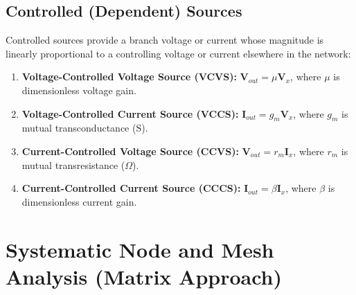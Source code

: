 \documentclass[12pt,a4paper]{article}
\begin{document}
\subsection{Controlled (Dependent) Sources}
Controlled sources provide a branch voltage or current whose magnitude is linearly proportional to a controlling voltage or current elsewhere in the network:
\begin{enumerate}[leftmargin=*, itemsep=2pt, topsep=2pt]
  \item \textbf{Voltage-Controlled Voltage Source (VCVS):} $\mathbf{V}_{out} = \mu \mathbf{V}_x$, where $\mu$ is dimensionless voltage gain.
  \item \textbf{Voltage-Controlled Current Source (VCCS):} $\mathbf{I}_{out} = g_m \mathbf{V}_x$, where $g_m$ is mutual transconductance ($\text{S}$).
  \item \textbf{Current-Controlled Voltage Source (CCVS):} $\mathbf{V}_{out} = r_m \mathbf{I}_x$, where $r_m$ is mutual transresistance ($\Omega$).
  \item \textbf{Current-Controlled Current Source (CCCS):} $\mathbf{I}_{out} = \beta \mathbf{I}_x$, where $\beta$ is dimensionless current gain.
\end{enumerate}

\section{Systematic Node and Mesh Analysis (Matrix Approach)}
\end{document}

